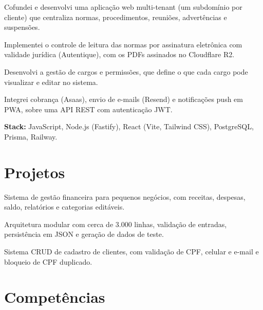 \documentclass[10pt]{article}
\begin{document}
\begin{itens}
  \item Cofundei e desenvolvi uma aplicação web multi-tenant (um subdomínio por cliente) que centraliza normas, procedimentos, reuniões, advertências e suspensões.
  \item Implementei o controle de leitura das normas por assinatura eletrônica com validade jurídica (Autentique), com os PDFs assinados no Cloudflare R2.
  \item Desenvolvi a gestão de cargos e permissões, que define o que cada cargo pode visualizar e editar no sistema.
  \item Integrei cobrança (Asaas), envio de e-mails (Resend) e notificações push em PWA, sobre uma API REST com autenticação JWT.
  \item \textbf{Stack:} JavaScript, Node.js (Fastify), React (Vite, Tailwind CSS), PostgreSQL, Prisma, Railway.
\end{itens}

\section{Projetos}
\begin{itens}
  \item Sistema de gestão financeira para pequenos negócios, com receitas, despesas, saldo, relatórios e categorias editáveis.
  \item Arquitetura modular com cerca de 3.000 linhas, validação de entradas, persistência em JSON e geração de dados de teste.
\end{itens}

\begin{itens}
  \item Sistema CRUD de cadastro de clientes, com validação de CPF, celular e e-mail e bloqueio de CPF duplicado.
\end{itens}

\section{Competências}
\end{document}
